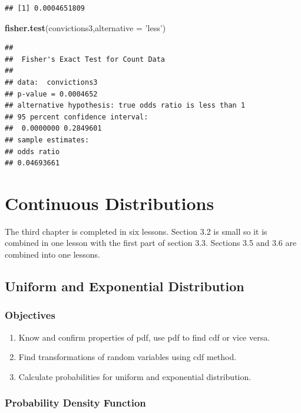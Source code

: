 \documentclass[]{book}
\newenvironment{Shaded}{\begin{snugshade}}{\end{snugshade}}
\newcommand{\KeywordTok}[1]{\textcolor[rgb]{0.13,0.29,0.53}{\textbf{#1}}}
\newcommand{\DataTypeTok}[1]{\textcolor[rgb]{0.13,0.29,0.53}{#1}}
\newcommand{\StringTok}[1]{\textcolor[rgb]{0.31,0.60,0.02}{#1}}
\newcommand{\NormalTok}[1]{#1}
\providecommand{\tightlist}{%
  \setlength{\itemsep}{0pt}\setlength{\parskip}{0pt}}
\theoremstyle{definition}
\theoremstyle{definition}
\theoremstyle{definition}
\theoremstyle{remark}
\begin{document}
\begin{verbatim}
## [1] 0.0004651809
\end{verbatim}

\begin{Shaded}
\begin{Highlighting}[]
\KeywordTok{fisher.test}\NormalTok{(convictions3,}\DataTypeTok{alternative =} \StringTok{'less'}\NormalTok{)}
\end{Highlighting}
\end{Shaded}

\begin{verbatim}
## 
##  Fisher's Exact Test for Count Data
## 
## data:  convictions3
## p-value = 0.0004652
## alternative hypothesis: true odds ratio is less than 1
## 95 percent confidence interval:
##  0.0000000 0.2849601
## sample estimates:
## odds ratio 
## 0.04693661
\end{verbatim}

\chapter{Continuous Distributions}\label{Chpt3}

The third chapter is completed in six lessons. Section 3.2 is small so
it is combined in one lesson with the first part of section 3.3.
Sections 3.5 and 3.6 are combined into one lessons.

\hypertarget{L12}{\section{Uniform and Exponential
Distribution}\label{L12}}

\subsection{Objectives}\label{objectives-11}

\begin{enumerate}
\def\labelenumi{\arabic{enumi}.}
\tightlist
\item
  Know and confirm properties of pdf, use pdf to find cdf or vice versa.
\item
  Find transformations of random variables using cdf method.
\item
  Calculate probabilities for uniform and exponential distribution.
\end{enumerate}

\subsection{Probability Density
Function}\label{probability-density-function}
\end{document}
